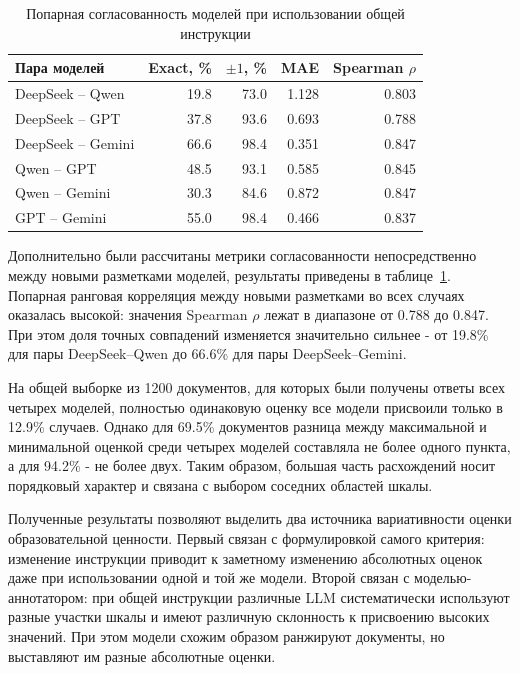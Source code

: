 \documentclass[12pt,a4paper]{article}
\begin{document}
\begin{table}[ht]
\centering
\small
\caption{Попарная согласованность моделей при использовании общей инструкции}
\label{tab:edu-pairwise}
\begin{tabular}{lrrrr}
\toprule
Пара моделей &
Exact, \% &
$\pm 1$, \% &
MAE &
Spearman $\rho$ \\
\midrule
DeepSeek -- Qwen &
19.8 & 73.0 & 1.128 & 0.803 \\

DeepSeek -- GPT &
37.8 & 93.6 & 0.693 & 0.788 \\

DeepSeek -- Gemini &
66.6 & 98.4 & 0.351 & 0.847 \\

Qwen -- GPT &
48.5 & 93.1 & 0.585 & 0.845 \\

Qwen -- Gemini &
30.3 & 84.6 & 0.872 & 0.847 \\

GPT -- Gemini &
55.0 & 98.4 & 0.466 & 0.837 \\
\bottomrule
\end{tabular}
\end{table}

Дополнительно были рассчитаны метрики согласованности непосредственно между 
новыми разметками моделей, результаты приведены в таблице~\ref{tab:edu-pairwise}.
Попарная ранговая корреляция между новыми разметками во всех случаях оказалась высокой:
значения Spearman $\rho$ лежат в диапазоне от 0.788 до 0.847.
При этом доля точных совпадений изменяется значительно сильнее - от 19.8\% 
для пары DeepSeek--Qwen до 66.6\% для пары DeepSeek--Gemini.

На общей выборке из 1200 документов, для которых были получены ответы всех четырех моделей,
полностью одинаковую оценку все модели присвоили только в 12.9\% случаев.
Однако для 69.5\% документов разница между максимальной и минимальной оценкой 
среди четырех моделей составляла не более одного пункта, а для 94.2\% - не более двух.
Таким образом, большая часть расхождений носит порядковый характер и связана 
с выбором соседних областей шкалы.

Полученные результаты позволяют выделить два источника вариативности оценки 
образовательной ценности. Первый связан с формулировкой самого критерия:
изменение инструкции приводит к заметному изменению абсолютных оценок даже 
при использовании одной и той же модели. Второй связан с моделью-аннотатором:
при общей инструкции различные LLM систематически используют разные участки 
шкалы и имеют различную склонность к присвоению высоких значений.
При этом модели схожим образом ранжируют документы, но выставляют им разные абсолютные оценки.
\end{document}

